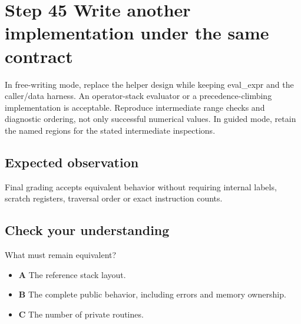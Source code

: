 \section{Step 45 Write another implementation under the same contract}\label{expression-s45}

In free-writing mode, replace the helper design while keeping eval\_expr and the caller/data harness. An operator-stack evaluator or a precedence-climbing implementation is acceptable. Reproduce intermediate range checks and diagnostic ordering, not only successful numerical values. In guided mode, retain the named regions for the stated intermediate inspections.

\subsection{Expected observation}
Final grading accepts equivalent behavior without requiring internal labels, scratch registers, traversal order or exact instruction counts.

\subsection{Check your understanding}
What must remain equivalent?

\begin{itemize}
  \item \textbf{A} The reference stack layout.
  \item \textbf{B} The complete public behavior, including errors and memory ownership.
  \item \textbf{C} The number of private routines.
\end{itemize}
